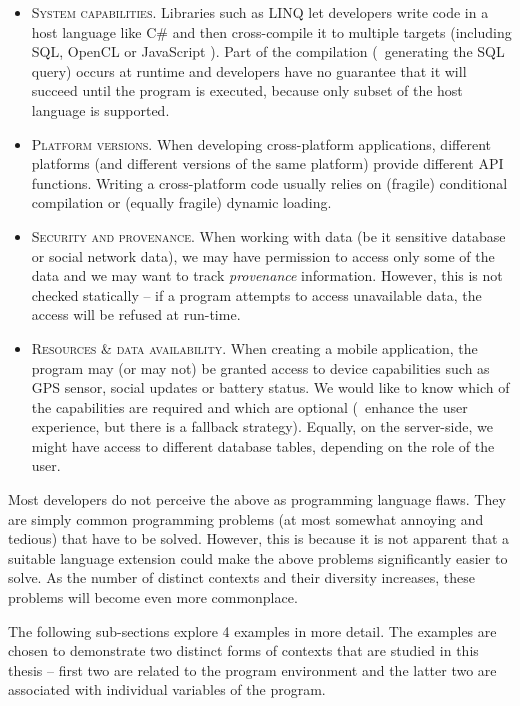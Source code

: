 \begin{itemize}
\item \textsc{System capabilities.} Libraries such as LINQ \cite{app-linq} let developers write code
  in a host language like C\# and then cross-compile it to multiple targets (including SQL, OpenCL
  or JavaScript \cite{app-hop-lang}). Part of the compilation (\eg~generating the SQL query) occurs
  at runtime and developers have no guarantee that it will succeed until the program is executed,
  because only subset of the host language is supported.

\item \textsc{Platform versions.} When developing cross-platform applications, different platforms
  (and different versions of the same platform) provide different API functions. Writing a
  cross-platform code usually relies on (fragile) conditional compilation or (equally fragile)
  dynamic loading.

\item \textsc{Security and provenance.} When working with data (be it sensitive database or social
   network data), we may have permission to access only some of the data and we may want to track
   \emph{provenance} information. However, this is not checked statically -- if a program attempts
   to access unavailable data, the access will be refused at run-time.

\item \textsc{Resources \& data availability.} When creating a mobile application, the program may
  (or may not) be granted access to device capabilities such as GPS sensor, social updates or battery
  status. We would like to know which of the capabilities are required and which are optional
  (\ie~enhance the user experience, but there is a fallback strategy). Equally, on the server-side,
  we might have access to different database tables, depending on the role of the user.
\end{itemize}

\noindent
Most developers do not perceive the above as programming language flaws. They are simply common
programming problems (at most somewhat annoying and tedious) that have to be solved. However, this
is because it is not apparent that a suitable language extension could make the above problems
significantly easier to solve. As the number of distinct contexts and their diversity increases,
these problems will become even more commonplace.

The following sub-sections explore 4 examples in more detail. The examples are chosen to
demonstrate two distinct forms of contexts that are studied in this thesis -- first two are
related to the program environment and the latter two are associated with individual variables of
the program.

